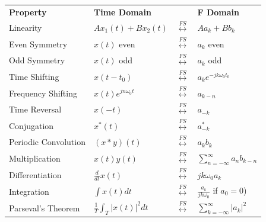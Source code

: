 \documentclass[twocolumn]{article}
\begin{document}
\begin{table}[ht]
    \centering
    \begin{tabular}{llll}
        \textbf{Property}    & \textbf{Time Domain}             &                                 & \textbf{F Domain}                         \\
        Linearity            & $A x_1(t) + B x_2(t)$            & $\overset{FS}{\leftrightarrow}$ & $A a_k + B b_k$                           \\
        Even Symmetry        & $x(t)$ even                      & $\overset{FS}{\leftrightarrow}$ & $a_k$ even                                \\
        Odd Symmetry         & $x(t)$ odd                       & $\overset{FS}{\leftrightarrow}$ & $a_k$ odd                                 \\
        Time Shifting        & $x(t - t_0)$                     & $\overset{FS}{\leftrightarrow}$ & $a_k e^{-j k \omega_0 t_0}$               \\
        Frequency Shifting   & $x(t) e^{j n \omega_0 t}$        & $\overset{FS}{\leftrightarrow}$ & $a_{k - n}$                               \\
        Time Reversal        & $x(-t)$                          & $\overset{FS}{\leftrightarrow}$ & $a_{-k}$                                  \\
        Conjugation          & $x^*(t)$                         & $\overset{FS}{\leftrightarrow}$ & $a_{-k}^*$                                \\
        Periodic Convolution & $(x \ast y)(t)$                  & $\overset{FS}{\leftrightarrow}$ & $a_k b_k$                                 \\
        Multiplication       & $x(t) y(t)$                      & $\overset{FS}{\leftrightarrow}$ & $\sum_{n=-\infty}^{\infty} a_n b_{k - n}$ \\
        Differentiation      & $\frac{d}{dt} x(t)$              & $\overset{FS}{\leftrightarrow}$ & $j k \omega_0 a_k$                        \\
        Integration          & $\int x(t) dt$                   & $\overset{FS}{\leftrightarrow}$ & $\frac{a_k}{j k \omega_0}$ if $a_0 = 0$)  \\
        Parseval's Theorem   & $\frac{1}{T} \int_T |x(t)|^2 dt$ & $\overset{FS}{\leftrightarrow}$ & $\sum_{k=-\infty}^{\infty} |a_k|^2$       \\
    \end{tabular}
\end{table}
\end{document}
